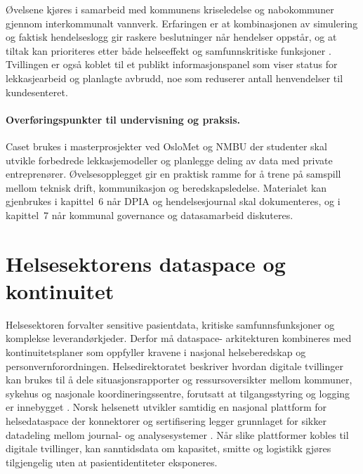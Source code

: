 Øvelsene kjøres i samarbeid med kommunens kriseledelse og nabokommuner gjennom interkommunalt vannverk. Erfaringen er at
kombinasjonen av simulering og faktisk hendelseslogg gir raskere beslutninger når hendelser oppstår, og at tiltak kan prioriteres
etter både helseeffekt og samfunnskritiske funksjoner \citep{oslovav2023digital}. Tvillingen er også koblet til et publikt
informasjonspanel som viser status for lekkasjearbeid og planlagte avbrudd, noe som reduserer antall henvendelser til
kundesenteret.

\paragraph{Overføringspunkter til undervisning og praksis.} Caset brukes i masterprosjekter ved OsloMet og NMBU der studenter
skal utvikle forbedrede lekkasjemodeller og planlegge deling av data med private entreprenører. Øvelsesopplegget gir en
praktisk ramme for å trene på samspill mellom teknisk drift, kommunikasjon og beredskapsledelse. Materialet kan gjenbrukes i
kapittel~6 når DPIA og hendelsesjournal skal dokumenteres, og i kapittel~7 når kommunal governance og datasamarbeid diskuteres.

\section{Helsesektorens dataspace og kontinuitet}
Helsesektoren forvalter sensitive pasientdata, kritiske samfunnsfunksjoner og komplekse leverandørkjeder. Derfor må dataspace-
arkitekturen kombineres med kontinuitetsplaner som oppfyller kravene i nasjonal helseberedskap og personvernforordningen.
Helsedirektoratet beskriver hvordan digitale tvillinger kan brukes til å dele situasjonsrapporter og ressursoversikter mellom
kommuner, sykehus og nasjonale koordineringssentre, forutsatt at tilgangsstyring og logging er innebygget \citep{helsedir2023beredskap}.
Norsk helsenett utvikler samtidig en nasjonal plattform for helsedataspace der konnektorer og sertifisering legger grunnlaget
for sikker datadeling mellom journal- og analysesystemer \citep{nhn2024dataspace}. Når slike plattformer kobles til digitale
tvillinger, kan sanntidsdata om kapasitet, smitte og logistikk gjøres tilgjengelig uten at pasientidentiteter eksponeres.

